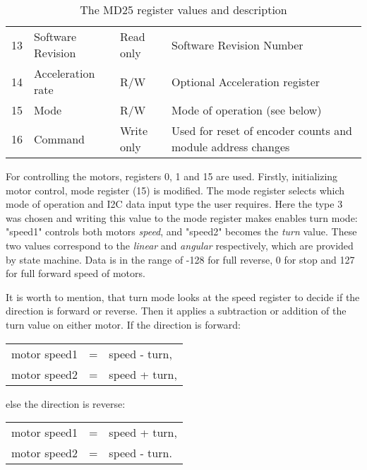 \begin{table}[!h]
\begin{tabular}{@{}llll@{}}
		13                & Software Revision & Read only           & Software Revision Number                                         \\
		14                & Acceleration rate & R/W                 & Optional Acceleration register                                   \\
		15                & Mode              & R/W                 & Mode of operation (see below)                                    \\
		16                & Command           & Write only          & Used for reset of encoder counts and module address changes      \\ \bottomrule
	\end{tabular}
	\caption{The MD25 register values and description}
\end{table}

\newpage
For controlling the motors, registers 0, 1 and 15 are used. Firstly, initializing motor control, mode register (15) is modified.
The mode register selects which mode of operation and I2C data input type the user requires. Here the type 3 was chosen and writing this value 
to the mode register makes enables turn mode: "speed1" controls both motors \textit{speed}, and "speed2" becomes the \textit{turn} value. 
These two values correspond to the \textit{linear} and \textit{angular} respectively, which are provided by state machine.
Data is in the range of -128 for full reverse, 0 for stop and 127 for full forward speed of motors.

It is worth to mention, that turn mode looks at the speed register to decide if the direction is forward or reverse. Then it applies a subtraction or addition of the turn value on either motor. If the direction is forward:
\begin{table}[!ht]
	\centering
	\begin{tabular}{lcl}
		motor speed1 & = & speed - turn,\\
		motor speed2 & = & speed + turn,
	\end{tabular}
\end{table}

else the direction is reverse:
\begin{table}[!ht]
	\centering
	\begin{tabular}{lcl}
		motor speed1 & = & speed + turn,\\
		motor speed2 & = & speed - turn.
	\end{tabular}
\end{table}

